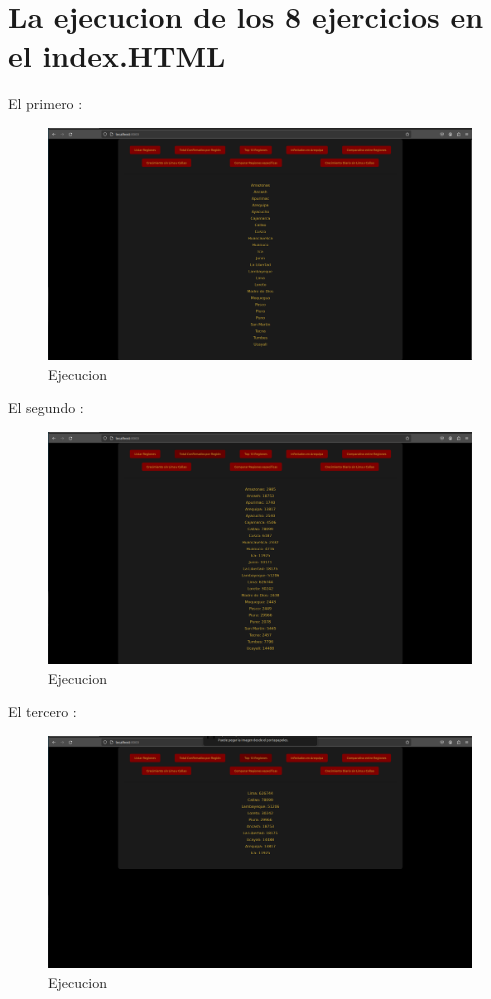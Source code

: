 \section{La ejecucion de los 8 ejercicios en el index.HTML}
El primero :
\begin{figure}[H]
  \centering
  \includegraphics[width=1.0\textwidth]{img/Ej1.png}
  \caption{Ejecucion}
\end{figure}
El segundo :
\begin{figure}[H]
  \centering
  \includegraphics[width=1.0\textwidth]{img/Ej2.png}
  \caption{Ejecucion}
\end{figure}
El tercero :
\begin{figure}[H]
  \centering
  \includegraphics[width=1.0\textwidth]{img/Ej3.png}
  \caption{Ejecucion}
\end{figure}
